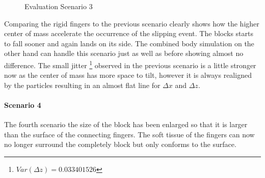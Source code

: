 \begin{figure}[htb]
	\centering
	\caption{Evaluation Scenario 3}
\end{figure}

Comparing the rigid fingers to the previous scenario clearly shows how the higher center of mass accelerate the occurrence of the slipping event. The blocks starts to fall sooner and again lands on its side. The combined body simulation on the other hand can handle this scenario just as well as before showing almost no difference. The small jitter \footnote{$Var(\Delta z)=0.033401526$} observed in the previous scenario is a little stronger now as the center of mass has more space to tilt, however it is always realigned by the particles resulting in an almost flat line for $\Delta x$ and $\Delta z$.

\clearpage
\paragraph{Scenario 4}
The fourth scenario the size of the block has been enlarged so that  it is larger than the surface of the connecting fingers. The soft tissue of the fingers can now no longer surround the completely block but only conforms to the surface.

